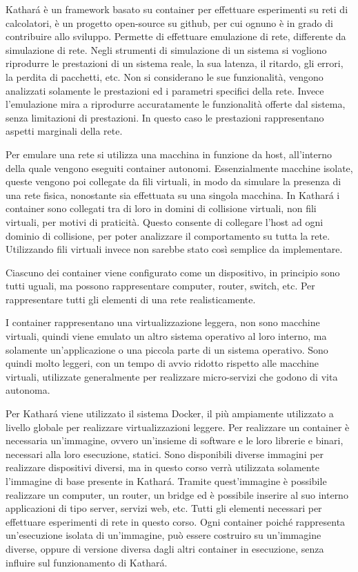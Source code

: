 \documentclass{article}
\numberwithin{equation}{subsection}
\begin{document}
Kathar\'{a} è un framework basato su container per effettuare esperimenti su reti di calcolatori, è un progetto open-source su github, per cui ognuno è in grado di contribuire allo sviluppo. 
Permette di effettuare emulazione di rete, differente da simulazione di rete. Negli strumenti di simulazione di un sistema si vogliono riprodurre le prestazioni di un sistema reale, la sua latenza, il ritardo, gli 
errori, la perdita di pacchetti, etc. Non si considerano le sue funzionalità, vengono analizzati solamente le prestazioni ed i parametri specifici della rete. 
Invece l'emulazione mira a riprodurre accuratamente le funzionalità offerte dal sistema, senza limitazioni di prestazioni. In questo caso le prestazioni rappresentano aspetti marginali della rete. 

Per emulare una rete si utilizza una macchina in funzione da host, all'interno della quale vengono eseguiti container autonomi. Essenzialmente macchine isolate, queste vengono poi collegate da fili virtuali, in 
modo da simulare la presenza di una rete fisica, nonostante sia effettuata su una singola macchina. 
In Kathar\'{a} i container sono collegati tra di loro in domini di collisione virtuali, non fili virtuali, per motivi di praticità. Questo consente di collegare l'host ad ogni dominio di collisione, per poter 
analizzare il comportamento su tutta la rete. Utilizzando fili virtuali invece non sarebbe stato così semplice da implementare. 

Ciascuno dei container viene configurato come un dispositivo, in principio sono tutti uguali, ma possono rappresentare computer, router, switch, etc. Per rappresentare tutti gli elementi di una rete realisticamente. 

I container rappresentano una virtualizzazione leggera, non sono macchine virtuali, quindi viene emulato un altro sistema operativo al loro interno, ma solamente un'applicazione o una piccola parte di un 
sistema operativo. Sono quindi molto leggeri, con un tempo di avvio ridotto rispetto alle macchine virtuali, utilizzate generalmente per realizzare micro-servizi che godono di vita autonoma. 


Per Kathar\'{a} viene utilizzato il sistema Docker, il più ampiamente utilizzato a livello globale per realizzare virtualizzazioni leggere. 
Per realizzare un container è necessaria un'immagine, ovvero un'insieme di software e le loro librerie e binari, necessari alla loro esecuzione, statici. Sono disponibili diverse immagini per realizzare dispositivi 
diversi, ma in questo corso verrà utilizzata solamente l'immagine di base presente in Kathar\'{a}. Tramite quest'immagine è possibile realizzare un computer, un router, un bridge ed è possibile inserire al suo 
interno applicazioni di tipo server, servizi web, etc. Tutti gli elementi necessari per effettuare esperimenti di rete in questo corso. Ogni container poiché rappresenta un'esecuzione isolata di un'immagine, può 
essere costruiro su un'immagine diverse, oppure di versione diversa dagli altri container in esecuzione, senza influire sul funzionamento di Kathar\'{a}. 
\end{document}
